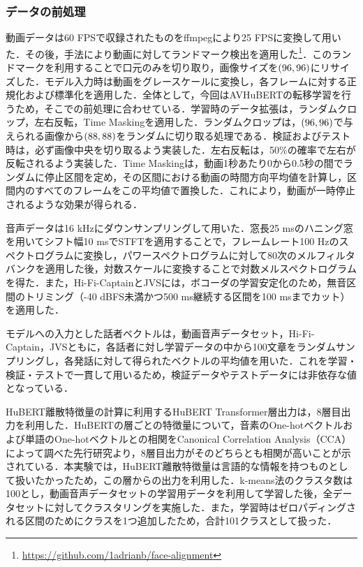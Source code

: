 \subsubsection{データの前処理}
動画データは60 FPSで収録されたものをffmpegにより25 FPSに変換して用いた．その後，手法\cite{bulat2017far}により動画に対してランドマーク検出を適用した\footnote{\url{https://github.com/1adrianb/face-alignment}}．このランドマークを利用することで口元のみを切り取り，画像サイズを$\left(96, 96\right)$にリサイズした．モデル入力時は動画をグレースケールに変換し，各フレームに対する正規化および標準化を適用した．全体として，今回はAVHuBERTの転移学習を行うため，そこでの前処理に合わせている．学習時のデータ拡張は，ランダムクロップ，左右反転，Time Maskingを適用した．ランダムクロップは，$\left(96, 96\right)$で与えられる画像から$\left(88, 88\right)$をランダムに切り取る処理である．検証およびテスト時は，必ず画像中央を切り取るよう実装した．左右反転は，50\%の確率で左右が反転されるよう実装した．Time Maskingは，動画1秒あたり0から0.5秒の間でランダムに停止区間を定め，その区間における動画の時間方向平均値を計算し，区間内のすべてのフレームをこの平均値で置換した．これにより，動画が一時停止されるような効果が得られる．

音声データは16 kHzにダウンサンプリングして用いた．窓長25 msのハニング窓を用いてシフト幅10 msでSTFTを適用することで，フレームレート100 Hzのスペクトログラムに変換し，パワースペクトログラムに対して80次のメルフィルタバンクを適用した後，対数スケールに変換することで対数メルスペクトログラムを得た．また，Hi-Fi-CaptainとJVSには，ボコーダの学習安定化のため，無音区間のトリミング（-40 dBFS未満かつ500 ms継続する区間を100 msまでカット）を適用した．

モデルへの入力とした話者ベクトルは，動画音声データセット，Hi-Fi-Captain，JVSともに，各話者に対し学習データの中から100文章をランダムサンプリングし，各発話に対して得られたベクトルの平均値を用いた．これを学習・検証・テストで一貫して用いるため，検証データやテストデータには非依存な値となっている．

HuBERT離散特徴量の計算に利用するHuBERT Transformer層出力は，8層目出力を利用した．HuBERTの層ごとの特徴量について，音素のOne-hotベクトルおよび単語のOne-hotベクトルとの相関をCanonical Correlation Analysis（CCA）によって調べた先行研究\cite{pasad2023comparative}より，8層目出力がそのどちらとも相関が高いことが示されている．本実験では，HuBERT離散特徴量は言語的な情報を持つものとして扱いたかったため，この層からの出力を利用した．k-means法のクラスタ数は100とし，動画音声データセットの学習用データを利用して学習した後，全データセットに対してクラスタリングを実施した．また，学習時はゼロパディングされる区間のためにクラスを1つ追加したため，合計101クラスとして扱った．

